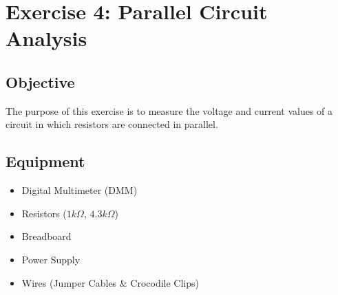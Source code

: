 
\section{Exercise 4: Parallel Circuit Analysis}

\subsection{Objective}
The purpose of this exercise is to measure the voltage and current values of a circuit in which resistors are connected in parallel.

\subsection{Equipment}
\begin{itemize}
    \item Digital Multimeter (DMM)
    \item Resistors ($1k\Omega$, $4.3k\Omega$)
    \item Breadboard
    \item Power Supply
    \item Wires (Jumper Cables \& Crocodile Clips)
\end{itemize}

\newpage
\thispagestyle{plain}

